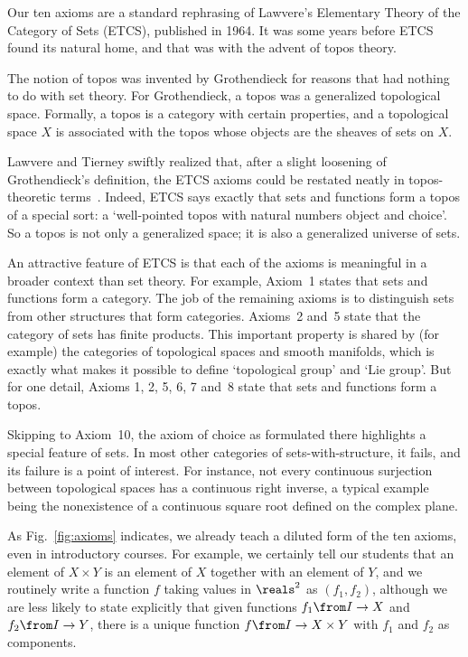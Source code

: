 \documentclass[12pt]{article}
\begin{document}
Our ten axioms are a standard rephrasing of Lawvere's Elementary Theory of
the Category of Sets (ETCS), published in 1964.  It was some years before
ETCS found its natural home, and that was with the advent of topos theory.

The notion of topos was invented by Grothendieck for reasons that had
nothing to do with set theory.  For Grothendieck, a topos was a generalized
topological space.  Formally, a topos is a category with
certain properties, and a topological space $X$ is associated with the
topos whose objects are the sheaves of sets on $X$.  

Lawvere and Tierney swiftly realized that, after a slight loosening of
Grothendieck's definition, the ETCS axioms could be restated neatly in
topos-theoretic terms~\cite{TierSTC,TierAST}.  Indeed, ETCS says exactly
that sets and functions form a topos of a special sort: a `well-pointed
topos with natural numbers object and choice'.  So a topos is not only a
generalized space; it is also a generalized universe of sets.

An attractive feature of ETCS is that each of the axioms is meaningful in a
broader context than set theory.  For example, Axiom~1 states that sets and
functions form a category.  The job of the remaining axioms is to
distinguish sets from other structures that form categories.  Axioms~2
and~5 state that the category of sets has finite products.  This important
property is shared by (for example) the categories of topological spaces
and smooth manifolds, which is exactly what makes it possible to define
`topological group' and `Lie group'.  But for one detail, Axioms 1, 2, 5,
6, 7 and~8 state that sets and functions form a topos.

Skipping to Axiom~10, the axiom of choice as formulated there highlights a
special feature of sets.  In most other categories of sets-with-structure,
it fails, and its failure is a point of interest.  For instance, not every
continuous surjection between topological spaces has a continuous right
inverse, a typical example being the nonexistence of a continuous square
root defined on the complex plane.


As Fig.~\ref{fig:axioms} indicates, we already teach a diluted form of the
ten axioms, even in introductory courses.  For example, we certainly tell
our students that an element of $X \times Y$ is an element of $X$ together
with an element of $Y$, and we routinely write a function $f$ taking values
in $\reals^2$ as $(f_1, f_2)$, although we are less likely to state
explicitly that given functions $f_1\from I \to X$ and $f_2\from I \to Y$,
there is a unique function $f\from I \to X \times Y$ with $f_1$ and $f_2$
as components.
\end{document}
